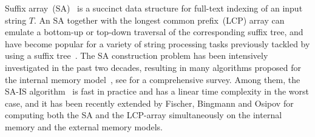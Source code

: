 \documentclass[10pt,journal,letterpaper,compsoc]{IEEEtran}
\begin{document}
\begin{CJK*}{GBK}{song}
\IEEEdisplaynontitleabstractindextext



%
\IEEEpeerreviewmaketitle



{

Suffix array~(SA)~\cite{Manber1993} is a succinct data structure for full-text indexing of an input string $T$. An SA together with the longest common prefix~(LCP) array can emulate a bottom-up or top-down traversal of the corresponding suffix tree, and have become popular for a variety of string processing tasks previously tackled by using a suffix tree~\cite{Abouelhodaa2004}. The SA construction problem has been intensively investigated in the past two decades, resulting in many algorithms proposed for the internal memory model~\cite{Burkhardt2003,Manzini2004,Schurmann2007, Ko2003, Kim2004, Karkkainen2003,nong2011}, see \cite{Puglisi2007} for a comprehensive survey. Among them, the SA-IS algorithm~\cite{nong2011} is fast in practice and has a linear time complexity in the worst case, and it has been recently extended by Fischer, Bingmann and Osipov \cite{Fischer11,Bingmann12} for computing both the SA and the LCP-array simultaneously on the internal memory and the external memory models.

}
\end{CJK*}
\end{document}
